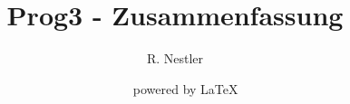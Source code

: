 \documentclass[ngerman]{scrartcl}
\title{Prog3 - Zusammenfassung}
\author{R. Nestler}
\date{\revisiondate ~ \revision ~ powered by \LaTeX}
\begin{document}
 
\twocolumn







 
\end{document}
